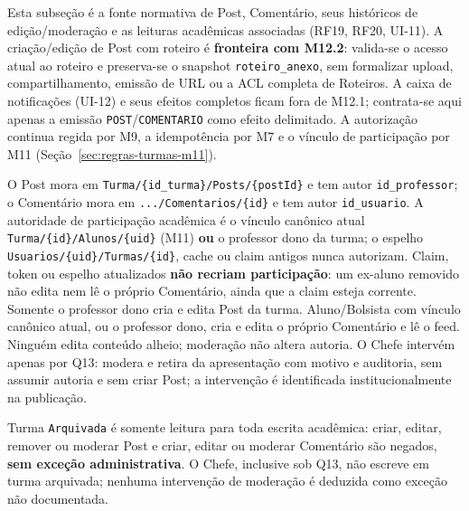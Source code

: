 Esta subseção é a fonte normativa de Post, Comentário, seus históricos de
edição/moderação e as leituras acadêmicas associadas (RF19, RF20, UI-11). A
criação/edição de Post com roteiro é \textbf{fronteira com M12.2}: valida-se o
acesso atual ao roteiro e preserva-se o snapshot \texttt{roteiro\_anexo}, sem
formalizar upload, compartilhamento, emissão de URL ou a ACL completa de
Roteiros. A caixa de notificações (UI-12) e seus efeitos completos ficam fora
de M12.1; contrata-se aqui apenas a emissão \texttt{POST}/\texttt{COMENTARIO}
como efeito delimitado. A autorização continua regida por M9, a idempotência
por M7 e o vínculo de participação por M11 (Seção~\ref{sec:regras-turmas-m11}).

\begin{regra}
O Post mora em \texttt{Turma/\{id\_turma\}/Posts/\{postId\}} e tem autor
\texttt{id\_professor}; o Comentário mora em
\texttt{.../Comentarios/\{id\}} e tem autor \texttt{id\_usuario}. A autoridade
de participação acadêmica é o vínculo canônico atual
\texttt{Turma/\{id\}/Alunos/\{uid\}} (M11) \textbf{ou} o professor dono da turma;
o espelho \texttt{Usuarios/\{uid\}/Turmas/\{id\}}, cache ou claim antigos nunca
autorizam. Claim, token ou espelho atualizados \textbf{não recriam
participação}: um ex-aluno removido não edita nem lê o próprio Comentário,
ainda que a claim esteja corrente. Somente o professor dono cria e edita Post
da turma. Aluno/Bolsista com vínculo canônico atual, ou o professor dono, cria
e edita o próprio Comentário e lê o feed. Ninguém edita conteúdo alheio;
moderação não altera autoria. O Chefe intervém apenas por Q13: modera e retira
da apresentação com motivo e auditoria, sem assumir autoria e sem criar Post; a
intervenção é identificada institucionalmente na publicação.
\end{regra}

\begin{regra}
Turma \texttt{Arquivada} é somente leitura para toda escrita acadêmica: criar,
editar, remover ou moderar Post e criar, editar ou moderar Comentário são
negados, \textbf{sem exceção administrativa}. O Chefe, inclusive sob Q13, não
escreve em turma arquivada; nenhuma intervenção de moderação é deduzida como
exceção não documentada.
\end{regra}

